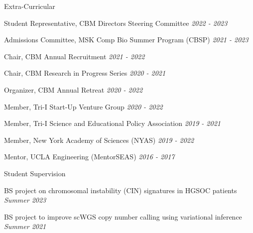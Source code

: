 \documentclass{resume} %
\begin{document}

\begin{rSection}{Extra-Curricular} \itemsep -3pt
\item Student Representative, CBM Directors Steering Committee \hfill {\em 2022 - 2023}
\item Admissions Committee, MSK Comp Bio Summer Program (CBSP) \hfill {\em 2021 - 2023}
\item Chair, CBM Annual Recruitment \hfill {\em 2021 - 2022}
\item Chair, CBM Research in Progress Series \hfill {\em 2020 - 2021}
\item Organizer, CBM Annual Retreat \hfill {\em 2020 - 2022}
\item Member, Tri-I Start-Up Venture Group \hfill {\em 2020 - 2022}
\item Member, Tri-I Science and Educational Policy Association \hfill {\em 2019 - 2021}
\item Member, New York Academy of Sciences (NYAS) \hfill {\em 2019 - 2022}
\item Mentor, UCLA Engineering (MentorSEAS) \hfill {\em 2016 - 2017}

\end{rSection}


\begin{rSection}{Student Supervision} \itemsep -3pt
\item BS project on chromosomal instability (CIN) signatures in HGSOC patients \hfill {\em Summer 2023}
\item BS project to improve scWGS copy number calling using variational inference \hfill {\em Summer 2021}

\end{rSection}


\end{document}
